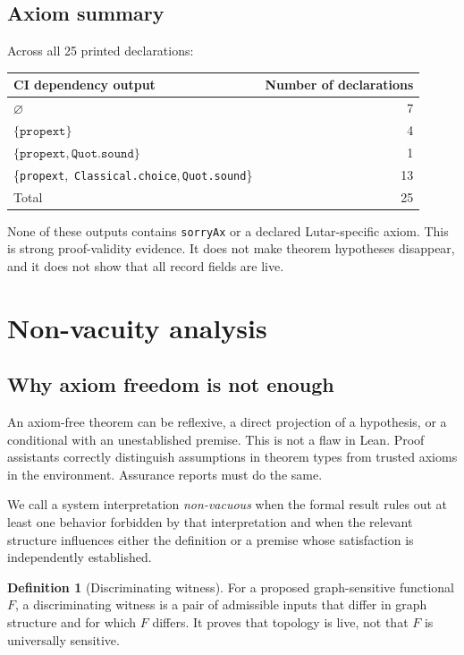 \documentclass[10pt,letterpaper]{article}
\theoremstyle{definition}
\newtheorem{definition}[theorem]{Definition}
\newcommand{\coretrio}{\{\texttt{propext},\,\allowbreak
  \texttt{Classical.choice},\,\allowbreak\texttt{Quot.sound}\}}
\newcommand{\none}{\(\varnothing\)}
\begin{document}
\subsection{Axiom summary}
Across all 25 printed declarations:
\begin{center}
\begin{tabular}{@{}lr@{}}
\toprule
CI dependency output & Number of declarations \\
\midrule
\none & 7 \\
\(\{\texttt{propext}\}\) & 4 \\
\(\{\texttt{propext},\texttt{Quot.sound}\}\) & 1 \\
\coretrio & 13 \\
\midrule
Total & 25 \\
\bottomrule
\end{tabular}
\end{center}
None of these outputs contains \texttt{sorryAx} or a declared Lutar-specific
axiom. This is strong proof-validity evidence. It does not make theorem
hypotheses disappear, and it does not show that all record fields are live.

\section{Non-vacuity analysis}\label{sec:nonvacuity}
\subsection{Why axiom freedom is not enough}
An axiom-free theorem can be reflexive, a direct projection of a hypothesis, or
a conditional with an unestablished premise. This is not a flaw in Lean.
Proof assistants correctly distinguish assumptions in theorem types from
trusted axioms in the environment. Assurance reports must do the same.

We call a system interpretation \emph{non-vacuous} when the formal result rules
out at least one behavior forbidden by that interpretation and when the
relevant structure influences either the definition or a premise whose
satisfaction is independently established.

\begin{definition}[Discriminating witness]
For a proposed graph-sensitive functional \(F\), a discriminating witness is a
pair of admissible inputs that differ in graph structure and for which \(F\)
differs. It proves that topology is live, not that \(F\) is universally
sensitive.
\end{definition}
\end{document}
